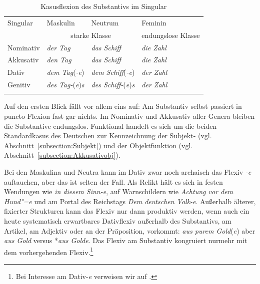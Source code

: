 \begin{table}
  \centering
  \begin{tabular}{l l l l}
    \lsptoprule
    Singular & Maskulin & Neutrum & Feminin \\
    & \multicolumn{2}{c}{starke Klasse} & endungslose Klasse \\
    \hline
    Nominativ & \textit{der Tag} & \textit{das Schiff} & \textit{die Zahl} \\
    
    Akkusativ & \textit{den Tag} & \textit{das Schiff} & \textit{die Zahl} \\
    
    Dativ & \textit{dem Tag}(\textit{-e}) & \textit{dem Schiff}(\textit{-e}) & \textit{der Zahl} \\
    
    Genitiv & \textit{des Tag-}(\textit{e})\textit{s} & \textit{des Schiff-}(\textit{e})\textit{s} & \textit{der Zahl}  \\
    \lspbottomrule 
  \end{tabular}
  \caption{Kasusflexion des Substantivs im Singular}
  \label{tab:Kasusfl_Subst_Sgl}
\end{table}

Auf den ersten Blick fällt vor allem eins auf: Am Substantiv selbst passiert in puncto Flexion fast gar nichts. Im Nominativ und Akkusativ aller Genera bleiben die Substantive endungslos. Funktional handelt es sich um die beiden Standardkasus des Deutschen zur Kennzeichnung der Subjekt- (vgl. Abschnitt~\ref{subsection:Subjekt}) und der Objektfunktion (vgl. Abschnitt~\ref{subsection:Akkusativobj}). 

Bei den Maskulina und Neutra kann im Dativ zwar noch archaisch das Flexiv \textit{-e} auftauchen, aber das ist selten der Fall. Als Relikt hält es sich in festen Wendungen wie \textit{in diesem Sinn-e}, auf Warnschildern wie \textit{Achtung vor dem Hund"=e} und am Portal des Reichstags \textit{Dem deutschen Volk-e}. Außerhalb älterer, fixierter Strukturen kann das Flexiv nur dann produktiv werden, wenn auch ein heute systematisch erwartbares Dativflexiv außerhalb des Substantivs, \zB am Artikel, am Adjektiv oder an der Präposition, vorkommt: \textit{aus purem Gold}(\textit{e}) aber \textit{aus Gold} versus *\textit{aus Golde}. Das Flexiv am Substantiv kongruiert nurmehr mit dem vorhergehenden Flexiv.\footnote{Bei Interesse am Dativ-\textit{e} verweisen wir auf \citet{Konopka2012}.}

